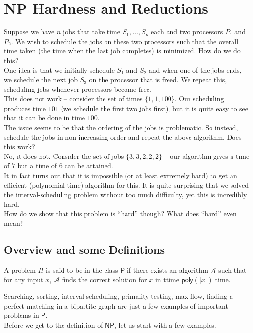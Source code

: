 \section{NP Hardness and Reductions}

Suppose we have $n$ jobs that take time $S_1,\ldots,S_n$ each and two processors $P_1$ and $P_2$. We wish to schedule the jobs on these two processors such that the overall time taken (the time when the last job completes) is minimized. How do we do this?\\

One idea is that we initially schedule $S_1$ and $S_2$ and when one of the jobs ends, we schedule the next job $S_3$ on the processor that is freed. We repeat this, scheduling jobs whenever processors become free.\\
This does not work -- consider the set of times $\{1,1,100\}$. Our scheduling produces time $101$ (we schedule the first two jobs first), but it is quite easy to see that it can be done in time $100$.\\

The issue seems to be that the ordering of the jobs is problematic. So instead, schedule the jobs in non-increasing order and repeat the above algorithm. Does this work?\\
No, it does not. Consider the set of jobs $\{3,3,2,2,2\}$ -- our algorithm gives a time of $7$ but a time of $6$ can be attained.\\

It in fact turns out that it is impossible (or at least extremely hard) to get an efficient (polynomial time) algorithm for this. It is quite surprising that we solved the interval-scheduling problem without too much difficulty, yet this is incredibly hard.\\
How do we show that this problem is ``hard'' though? What does ``hard'' even mean?

\subsection{Overview and some Definitions}

\begin{fdef}
	A problem $\mathsf{\Pi}$ is said to be in the class $\mathsf{P}$ if there exists an algorithm $\mathcal{A}$ such that for any input $x$, $\mathcal{A}$ finds the correct solution for $x$ in ttime $\textsf{poly}(|x|)$ time.
\end{fdef}

Searching, sorting, interval scheduling, primality testing, max-flow, finding a perfect matching in a bipartite graph are just a few examples of important problems in $\mathsf{P}$.\\
Before we get to the definition of $\mathsf{NP}$, let us start with a few examples.

